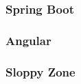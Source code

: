 \documentclass[../main.tex]{subfiles}
\begin{document}
	\subsubsection{Spring Boot}
	
	\subsubsection{Angular}
	
	\subsubsection{Sloppy Zone}
	
\end{document}
